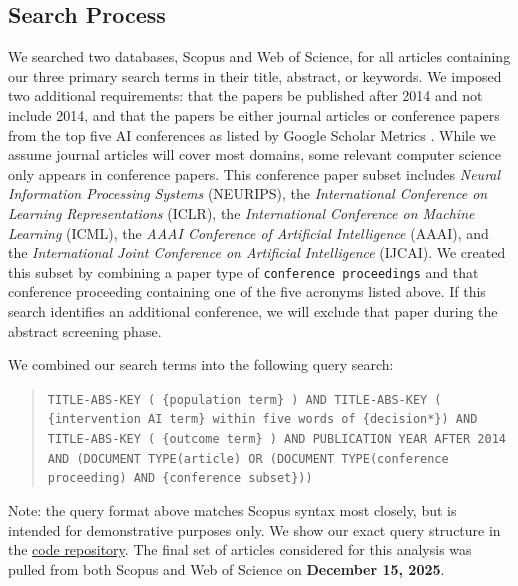 \documentclass[preprint,12pt]{elsarticle}
\providecommand{\DIFaddbegin}{} %
\providecommand{\DIFaddend}{} %
\newcommand{\DIFaddincludegraphics}[2][]{{\color{blue}\fbox{\DIFOincludegraphics[#1]{#2}}}} %
\DeclareRobustCommand{\DIFaddbegin}{\DIFOaddbegin \let\includegraphics\DIFaddincludegraphics} %
\DeclareRobustCommand{\DIFaddend}{\DIFOaddend \let\includegraphics\DIFOincludegraphics} %
\begin{document}
\begin{table}[ht]
\centering
\caption{Search terms used to produce Cartesian-product-based queries}
\label{tab:search_terms}
\renewcommand{\arraystretch}{1.25}

\end{table}

\DIFaddbegin \FloatBarrier

\DIFaddend \subsection{Search Process}
We searched two databases, Scopus and Web of Science, for all articles
containing our three primary search terms in their title, abstract, or keywords.
We imposed two additional requirements: that the papers be published after 2014
and not include 2014, and that the papers be either journal articles or
conference papers from the top five AI conferences as listed by Google Scholar
Metrics \cite{google_scholar_metrics}. While we assume journal articles will
cover most domains, some relevant computer science only appears in conference
papers. This conference paper subset includes \textit{Neural Information
Processing Systems} (NEURIPS), the \textit{International Conference on Learning
Representations} (ICLR), the \textit{International Conference on Machine
Learning} (ICML), the \textit{AAAI Conference of Artificial Intelligence}
(AAAI), and the \textit{International Joint Conference on Artificial
Intelligence} (IJCAI). We created this subset by combining a paper type of
\texttt{conference proceedings} and that conference proceeding containing one of
the five acronyms listed above. If this search identifies an additional
conference, we will exclude that paper during the abstract screening phase. 

We combined our search terms into the following query search:
\begin{quote}
\texttt{TITLE-ABS-KEY ( \{population term\} ) AND TITLE-ABS-KEY ( \{intervention
AI term\} within five words of \{decision*\}) AND TITLE-ABS-KEY ( \{outcome
term\} ) AND PUBLICATION YEAR AFTER 2014 AND (DOCUMENT TYPE(article) OR
(DOCUMENT TYPE(conference proceeding) AND \{conference subset\}))}
\end{quote}

Note: the query format above matches Scopus syntax most closely, but is intended
for demonstrative purposes only. We show our exact query structure in the
\href{https://github.com/aims-umich/2025-panczyk-slr}{code repository}. The
final set of articles considered for this analysis was pulled from both Scopus
and Web of Science on \textbf{December 15, 2025}.
\end{document}
